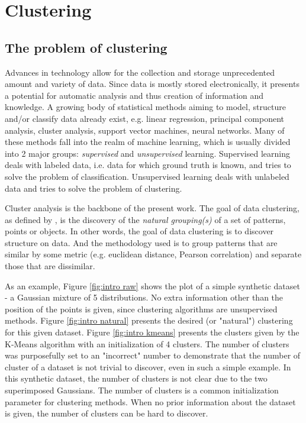 
\chapter{Clustering}


\section{The problem of clustering}
\label{sec:clustering}

Advances in technology allow for the collection and storage unprecedented amount and variety of data.
Since data is mostly stored electronically, it presents a potential for automatic analysis and thus creation of information and knowledge.
A growing body of statistical methods aiming to model, structure and/or classify data already exist, e.g. linear regression, principal component analysis, cluster analysis, support vector machines, neural networks.
Many of these methods fall into the realm of machine learning, which is usually divided into 2 major groups: \textit{supervised} and \textit{unsupervised} learning.
Supervised learning deals with labeled data, i.e. data for which ground truth is known, and tries to solve the problem of classification. %
Unsupervised learning deals with unlabeled data and tries to solve the problem of clustering. %

Cluster analysis is the backbone of the present work.
The goal of data clustering, as defined by \cite{Jain2010}, is the discovery of the \textit{natural grouping(s)} of a set of patterns, points or objects.
In other words, the goal of data clustering is to discover structure on data.
And the methodology used is to group patterns that are similar by some metric (e.g. euclidean distance, Pearson correlation) and separate those that are dissimilar. %

As an example, Figure \ref{fig:intro raw} shows the plot of a simple synthetic dataset - a Gaussian mixture of 5 distributions.
No extra information other than the position of the points is given, since clustering algorithms are unsupervised methods.
Figure \ref{fig:intro natural} presents the desired (or "natural") clustering for this given dataset.
Figure \ref{fig:intro kmeans} presents the clusters given by the K-Means algorithm with an initialization of 4 clusters.
The number of clusters was purposefully set to an "incorrect" number to demonstrate that the number of cluster of a dataset is not trivial to discover, even in such a simple example.
In this synthetic dataset, the number of clusters is not clear due to the two superimposed Gaussians.
The number of clusters is a common initialization parameter for clustering methods.
When no prior information about the dataset is given, the number of clusters can be hard to discover.

